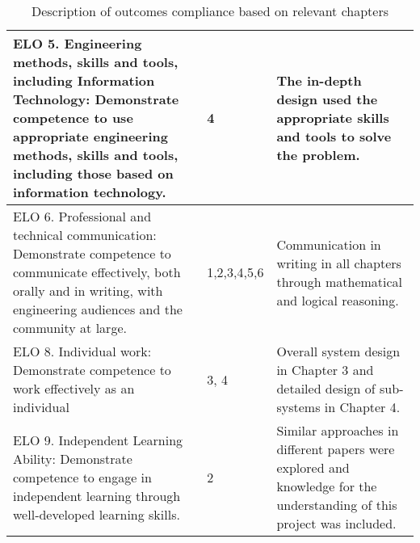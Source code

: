 \begin{table}[H]
\begin{center}
\begin{tabular}{ | p{8cm} | l | p{6cm} |}
    ELO 5. Engineering methods, skills and tools, including Information Technology: Demonstrate competence to use appropriate engineering methods, skills and tools, including those based on information technology. & 4 & The in-depth design used the appropriate skills and tools to solve the problem. \\  \hline



	ELO 6. Professional and technical communication: Demonstrate competence to communicate effectively, both orally and in writing, with engineering audiences and the community at large. & 1,2,3,4,5,6 &  Communication in writing in all chapters through mathematical and logical reasoning.\\  \hline




    ELO 8. Individual work: Demonstrate competence to work effectively as an individual & 3, 4 & Overall system design in Chapter 3 and detailed design of sub-systems in Chapter 4. \\  \hline



    ELO 9. Independent Learning Ability: Demonstrate competence to engage in independent learning through well‐developed learning skills. & 2 &  Similar approaches in different papers were explored and knowledge for the understanding of this project was included.\\  \hline

    \hline
    \end{tabular}
\end{center}
  \caption{ Description of outcomes compliance based on relevant chapters}
    \label{tab:tableb1}
\end{table}